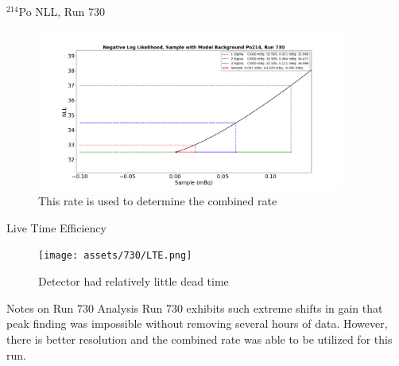 \documentclass[aspectratio=169]{beamer}
\begin{document}
\begin{frame}{$^{214}$Po NLL, Run 730}
    \begin{figure}
        \begin{center}
            \includegraphics[width=0.9\textwidth]
            {assets/730/NLL214.png}
            \caption{This rate is used to determine the combined rate}
        \end{center}
    \end{figure}
\end{frame}

\begin{frame}{Live Time Efficiency}
    \begin{figure}
        \begin{center}
            \texttt{[image: assets/730/LTE.png]}
            \caption{Detector had relatively little dead time}
        \end{center}
    \end{figure}
\end{frame}

\begin{frame}{Notes on Run 730 Analysis}
    Run 730 exhibits such extreme shifts in gain that peak finding was impossible without removing 
    several hours of data.
    However, there is better resolution and the combined rate was able to be utilized for this run.


    \hyperlink{RvT_730}{}
\end{frame}
\end{document}
